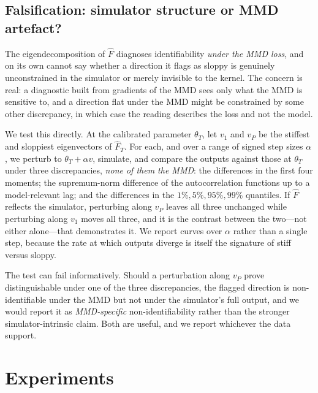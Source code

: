\documentclass[10pt,twocolumn]{article}
\newcommand{\Fhat}{\hat{F}}
\begin{document}
\subsection{Falsification: simulator structure or MMD artefact?}
\label{sec:method:falsification}

The eigendecomposition of $\Fhat$ diagnoses identifiability \emph{under the MMD
loss}, and on its own cannot say whether a direction it flags as sloppy is genuinely
unconstrained in the simulator or merely invisible to the kernel. The concern is
real: a diagnostic built from gradients of the MMD sees only what the MMD is
sensitive to, and a direction flat under the MMD might be constrained by some other
discrepancy, in which case the reading describes the loss and not the model.

We test this directly. At the calibrated parameter $\theta_T$, let $v_1$ and $v_P$ be
the stiffest and sloppiest eigenvectors of $\Fhat_T$. For each, and over a range of
signed step sizes $\alpha$, we perturb to $\theta_T + \alpha v$, simulate, and
compare the outputs against those at $\theta_T$ under three discrepancies, \emph{none
of them the MMD}: the differences in the first four moments; the supremum-norm
difference of the autocorrelation functions up to a model-relevant lag; and the
differences in the $1\%, 5\%, 95\%, 99\%$ quantiles. If $\Fhat$ reflects the
simulator, perturbing along $v_P$ leaves all three unchanged while perturbing along
$v_1$ moves all three, and it is the contrast between the two---not either alone---that
demonstrates it. We report curves over $\alpha$ rather than a single step, because
the rate at which outputs diverge is itself the signature of stiff versus sloppy.

The test can fail informatively. Should a perturbation along $v_P$ prove
distinguishable under one of the three discrepancies, the flagged direction is
non-identifiable under the MMD but not under the simulator's full output, and we
would report it as \emph{MMD-specific} non-identifiability rather than the stronger
simulator-intrinsic claim. Both are useful, and we report whichever the data
support.

\section{Experiments}
\label{sec:experiments}
\end{document}
